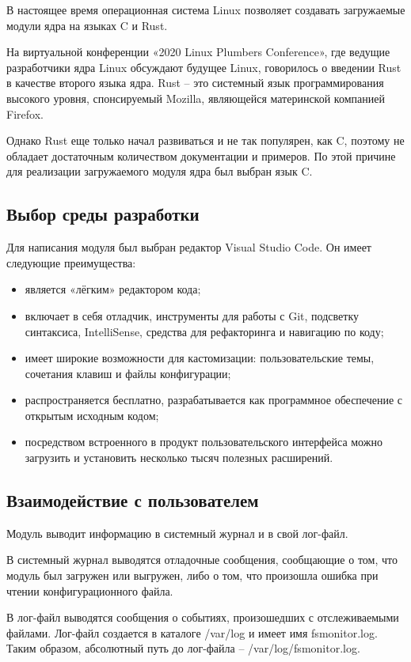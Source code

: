 \documentclass[a4paper,14pt]{article}
\begin{document}
В настоящее время операционная система Linux позволяет создавать загружаемые модули ядра на языках C и Rust.

На виртуальной конференции «2020 Linux Plumbers Conference», где ведущие разработчики ядра Linux обсуждают будущее Linux, говорилось о введении Rust в качестве второго языка ядра. Rust – это системный язык программирования высокого уровня, спонсируемый Mozilla, являющейся материнской компанией Firefox.

Однако Rust еще только начал развиваться и не так популярен, как C, поэтому не обладает достаточным количеством документации и примеров. По этой причине для реализации загружаемого модуля ядра был выбран язык C.

\subsection{Выбор среды разработки}

Для написания модуля был выбран редактор Visual Studio Code. Он имеет следующие преимущества:

\begin{itemize}
	\item является «лёгким» редактором кода;
	\item включает в себя отладчик, инструменты для работы с Git, подсветку синтаксиса, IntelliSense,  средства для рефакторинга и навигацию по коду;
	\item имеет широкие возможности для кастомизации: пользовательские темы, сочетания клавиш и файлы конфигурации;
	\item распространяется бесплатно, разрабатывается как программное обеспечение с открытым исходным кодом;
	\item посредством встроенного в продукт пользовательского интерфейса можно загрузить и установить несколько тысяч полезных расширений.
\end{itemize}

\subsection{Взаимодействие с пользователем}

Модуль выводит информацию в системный журнал и в свой лог-файл.

В системный журнал выводятся отладочные сообщения, сообщающие о том, что модуль был загружен или выгружен, либо о том, что произошла ошибка при чтении конфигурационного файла.

В лог-файл выводятся сообщения о событиях, произошедших с отслеживаемыми файлами. Лог-файл создается в каталоге /var/log и имеет имя fsmonitor.log. Таким образом, абсолютный путь до лог-файла -- /var/log/fsmonitor.log.
\end{document}
